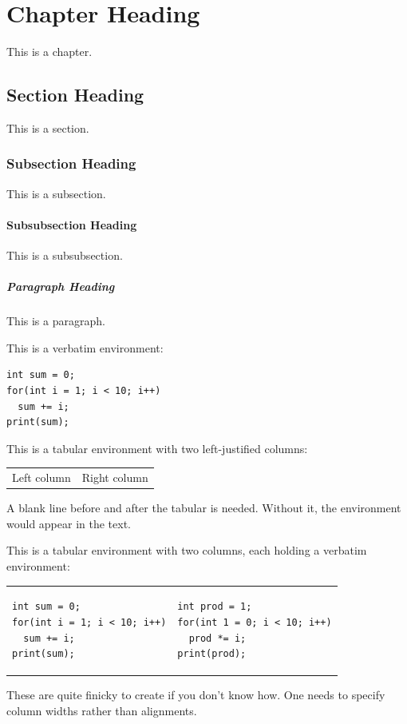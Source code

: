 \documentclass[12pt, oneside]{book}
\begin{document}
\chapter{Chapter Heading}
This is a chapter.

\section{Section Heading}
This is a section.

\subsection{Subsection Heading}
This is a subsection.

\subsubsection{Subsubsection Heading}
This is a subsubsection.

\paragraph{Paragraph Heading}
This is a paragraph.

\medskip
\medskip
\medskip
This is a verbatim environment:
\begin{verbatim}
int sum = 0;
for(int i = 1; i < 10; i++)
  sum += i;
print(sum);
\end{verbatim}


This is a tabular environment with two left-justified columns:

\begin{tabular}{ ll }
Left column
&
Right column
\end{tabular}

A blank line before and after the tabular is needed. Without it, the environment would appear in the text.


\medskip
This is a tabular environment with two columns, each holding a verbatim environment:

\begin{tabular}{ m{7cm}  m{7cm} }
\begin{verbatim}
int sum = 0;
for(int i = 1; i < 10; i++)
  sum += i;
print(sum);
\end{verbatim}
& 
\begin{verbatim}
int prod = 1;
for(int 1 = 0; i < 10; i++)
  prod *= i;
print(prod);
\end{verbatim}
\end{tabular}


These are quite finicky to create if you don't know how. One needs to specify column widths rather than alignments.

\end{document}
